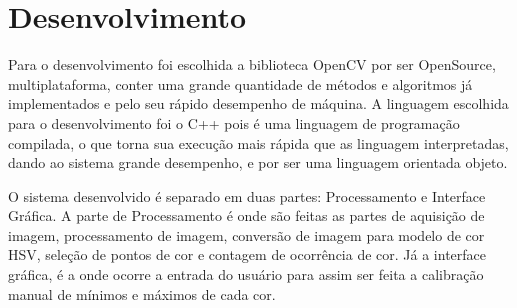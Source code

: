 	
	\chapter{Desenvolvimento} 
	
			Para o desenvolvimento foi escolhida a biblioteca OpenCV por ser OpenSource, multiplataforma, conter uma grande quantidade de métodos e algoritmos já implementados	e pelo seu rápido desempenho de máquina.
			A linguagem escolhida para o desenvolvimento foi o C++ pois é uma linguagem de programação compilada, o que torna sua execução mais rápida que as linguagem interpretadas, dando ao sistema grande desempenho, e por ser uma linguagem orientada objeto. 
			
			O sistema desenvolvido é separado em duas partes: Processamento e Interface Gráfica.
			A parte de Processamento é onde são feitas as partes de aquisição de imagem, processamento de imagem, conversão de imagem para modelo de cor HSV, seleção de pontos de cor e contagem de ocorrência de cor. Já a interface gráfica, é a onde ocorre a entrada do usuário para assim ser feita a calibração manual de mínimos e máximos de cada cor.
		
